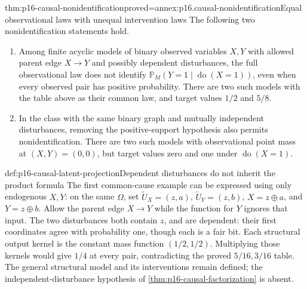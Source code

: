 \begin{hbtheorem}{thm:p16-causal-nonidentification}{proved=annex:p16.causal-nonidentification}{Equal observational laws with unequal intervention laws}
The following two nonidentification statements hold.
\begin{enumerate}
\item Among finite acyclic models of binary observed variables \(X,Y\)
      with allowed parent edge \(X\to Y\) and possibly dependent
      disturbances, the full observational law does not identify
      \(\mathbb P_M(Y=1\mid\operatorname{do}(X=1))\), even when
      every observed pair has positive probability. There are two such
      models with the table above as their common law, and target values
      \(1/2\) and \(5/8\).
\item In the class with the same binary graph and mutually independent
      disturbances, removing the positive-support hypothesis also permits
      nonidentification. There are two such models with observational
      point mass at \((X,Y)=(0,0)\), but target values zero and one
      under \(\operatorname{do}(X=1)\).
\end{enumerate}
\end{hbtheorem}

\begin{hbwarning}{def:p16-causal-latent-projection}{Dependent disturbances do not inherit the product formula}
The first common-cause example can be expressed using only endogenous
\(X,Y\): on the same \(\Omega\), set
\(\widetilde U_X=(z,a)\), \(\widetilde U_Y=(z,b)\),
\(X=z\oplus a\), and \(Y=z\oplus b\). Allow the parent edge
\(X\to Y\) while the function for \(Y\) ignores that input.
The two disturbances both contain \(z\), and are dependent: their
first coordinates agree with probability one, though each is a fair bit.
Each structural output kernel is the constant mass function \((1/2,1/2)\).
Multiplying those kernels would give \(1/4\) at every pair, contradicting
the proved \(5/16,3/16\) table. The general structural model and its
interventions remain defined; the independent-disturbance hypothesis of
\cref{thm:p16-causal-factorization} is absent.
\end{hbwarning}

